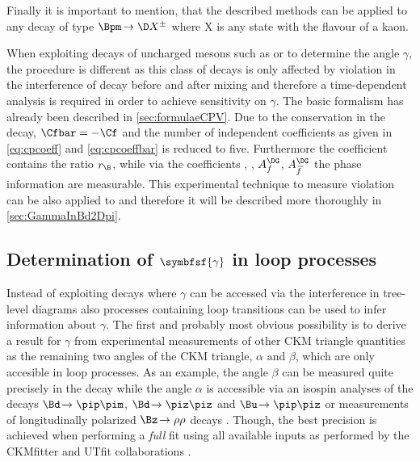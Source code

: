 Finally it is important to mention, that the described methods can be applied to any decay of type $\Bpm\!\to\D X^{\pm}$ where X is any state with the flavour of a kaon.

When exploiting decays of uncharged \B mesons such as \mbox{\BsToDsK} or \mbox{\BdToDpi} to determine the angle $\gamma$, the procedure is different as this class of decays is only affected by \CP violation in the interference of decay before and after mixing and therefore a time-dependent analysis is required in order to achieve sensitivity on $\gamma$.
The basic formalism has already been described in \cref{sec:formulaeCPV}.
Due to the \CP conservation in the decay, $\Cfbar=-\Cf$ and the number of independent coefficients as given in \cref{eq:cpcoeff} and \cref{eq:cpcoeffbar} is reduced to five.
Furthermore the \CP coefficient \Cf contains the ratio $r_\B$, while via the coefficients \Sf, \Sfbar, $A_f^{\DG}$, $A_{\kern 1.5pt\overline{\kern -1.5pt f\kern 1.5pt}}^{\DG}$ the phase information are measurable.
This experimental technique to measure \CP violation can be also applied to \BdToDpi and therefore it will be described more thoroughly in \cref{sec:GammaInBd2Dpi}.

\subsection[head={Determination of $\gamma$ in loop processes},tocentry={Determination of $\gamma$ in loop processes}]{Determination of $\symbfsf{\gamma}$ in loop processes}
\label{sec:gamamInLoops}

Instead of exploiting decays where $\gamma$ can be accessed via the interference in tree-level diagrams also processes containing loop transitions can be used to infer information about $\gamma$.
The first and probably most obvious possibility is to derive a result for $\gamma$ from experimental measurements of other CKM triangle quantities as the remaining two angles of the CKM triangle, $\alpha$ and $\beta$, which are only accesible in loop processes.
As an example, the angle $\beta$ can be measured quite precisely in the decay \mbox{\BdToJPsiKS} while the angle $\alpha$ is accessible via an isospin analyses of the decays $\Bd\!\to\pip\pim$, $\Bd\!\to\piz\piz$ and $\Bu\!\to\pip\piz$ \cite{IsospinAlpha} or measurements of longitudinally polarized $\Bz\!\to\rho\rho$ decays \cite{alpha_BaBar, alpha_Belle}. Though, the best precision is achieved when performing a \emph{full} fit using all available inputs as performed by the CKMfitter and UTfit collaborations \cite{CKMfitter2015, UTfit-UT}.


